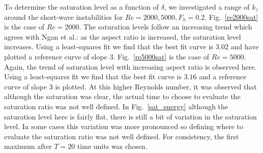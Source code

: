 To determine the saturation level as a function of $\delta$, we investigated a range of $k_{z}$ around the short-wave instabilities for $Re=2000,5000, F_{h}=0.2$. Fig.~\ref{re2000sat} is the case of $Re=2000$. The saturation levels follow an increasing trend which agrees with Ngan et al.\cite{ngan2005}: as the aspect ratio is increased, the saturation level increases. Using a least-squares fit we find that the best fit curve is $3.02$ and have plotted a reference curve of slope $3$. Fig.~\ref{re5000sat} is the case of $Re=5000$. Again, the trend of saturation level with increasing aspect ratio is observed here. Using a least-squares fit we find that the best fit curve is $3.16$ and a reference curve of slope $3$ is plotted. At this higher Reynolds number, it was observed that although the saturation was clear, the actual time to choose to evaluate the saturation ratio was not well defined. In Fig.~\ref{sat_energy} although the saturation level here is fairly flat, there is still a bit of variation in the saturation level. In some cases this variation was more pronounced so defining where to evaluate the saturation ratio was not well defined. For consistency, the first maximum after $T=20$ time units was chosen. 

